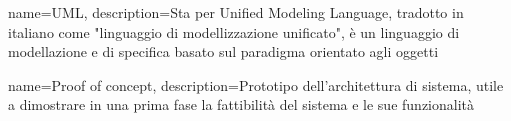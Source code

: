 {
	name={UML},
	description={Sta per Unified Modeling Language, tradotto in italiano come "linguaggio di modellizzazione unificato", è un linguaggio di modellazione e di specifica basato sul paradigma orientato agli oggetti}
}

{
	name={Proof of concept},
	description={Prototipo dell'architettura di sistema, utile a dimostrare in una prima fase la fattibilità del sistema e le sue funzionalità}
}